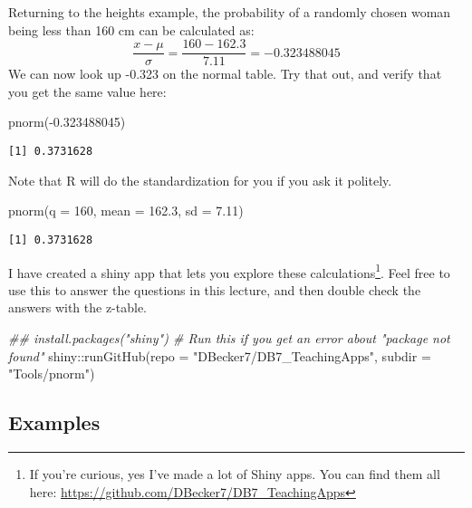 \documentclass[
  letterpaper,
  DIV=11,
  numbers=noendperiod]{scrreprt}
\newenvironment{Shaded}{\begin{snugshade}}{\end{snugshade}}
\newcommand{\AttributeTok}[1]{\textcolor[rgb]{0.40,0.45,0.13}{#1}}
\newcommand{\DecValTok}[1]{\textcolor[rgb]{0.68,0.00,0.00}{#1}}
\newcommand{\DocumentationTok}[1]{\textcolor[rgb]{0.37,0.37,0.37}{\textit{#1}}}
\newcommand{\FloatTok}[1]{\textcolor[rgb]{0.68,0.00,0.00}{#1}}
\newcommand{\FunctionTok}[1]{\textcolor[rgb]{0.28,0.35,0.67}{#1}}
\newcommand{\NormalTok}[1]{\textcolor[rgb]{0.00,0.23,0.31}{#1}}
\newcommand{\SpecialCharTok}[1]{\textcolor[rgb]{0.37,0.37,0.37}{#1}}
\newcommand{\StringTok}[1]{\textcolor[rgb]{0.13,0.47,0.30}{#1}}
\begin{document}
Returning to the heights example, the probability of a randomly chosen
woman being less than 160 cm can be calculated as: \[
\frac{x - \mu}{\sigma} = \frac{160 - 162.3}{7.11} = -0.323488045
\] We can now look up -0.323 on the normal table. Try that out, and
verify that you get the same value here:

\begin{Shaded}
\begin{Highlighting}[]
\FunctionTok{pnorm}\NormalTok{(}\SpecialCharTok{{-}}\FloatTok{0.323488045}\NormalTok{)}
\end{Highlighting}
\end{Shaded}

\begin{verbatim}
[1] 0.3731628
\end{verbatim}

Note that R will do the standardization for you if you ask it politely.

\begin{Shaded}
\begin{Highlighting}[]
\FunctionTok{pnorm}\NormalTok{(}\AttributeTok{q =} \DecValTok{160}\NormalTok{, }\AttributeTok{mean =} \FloatTok{162.3}\NormalTok{, }\AttributeTok{sd =} \FloatTok{7.11}\NormalTok{)}
\end{Highlighting}
\end{Shaded}

\begin{verbatim}
[1] 0.3731628
\end{verbatim}

I have created a shiny app that lets you explore these
calculations\footnote{If you're curious, yes I've made a lot of Shiny
  apps. You can find them all here:
  \url{https://github.com/DBecker7/DB7_TeachingApps}}. Feel free to use
this to answer the questions in this lecture, and then double check the
answers with the z-table.

\begin{Shaded}
\begin{Highlighting}[]
\DocumentationTok{\#\# install.packages("shiny") \# Run this if you get an error about "package not found"}
\NormalTok{shiny}\SpecialCharTok{::}\FunctionTok{runGitHub}\NormalTok{(}\AttributeTok{repo =} \StringTok{"DBecker7/DB7\_TeachingApps"}\NormalTok{, }
    \AttributeTok{subdir =} \StringTok{"Tools/pnorm"}\NormalTok{)}
\end{Highlighting}
\end{Shaded}

\hypertarget{examples-1}{%
\subsection{Examples}\label{examples-1}}
\end{document}
